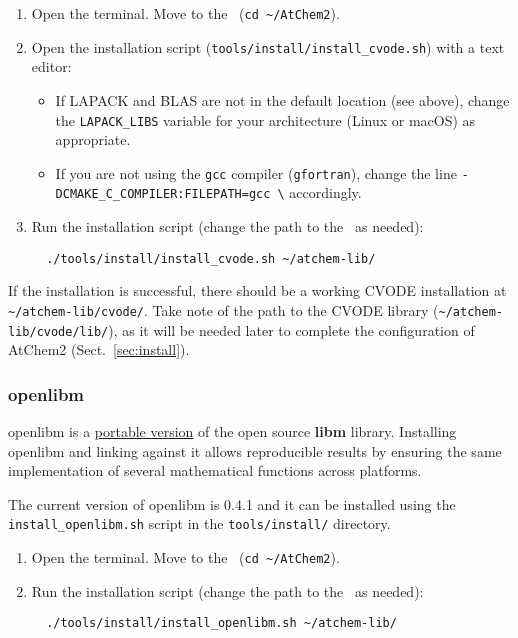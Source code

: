 \begin{enumerate}
\item Open the terminal. Move to the \maindir\ (\verb|cd ~/AtChem2|).
\item Open the installation script (\texttt{tools/install/install\_cvode.sh})
  with a text editor:
  \begin{itemize}
  \item If LAPACK and BLAS are not in the default location (see
    above), change the \texttt{LAPACK\_LIBS} variable for your
    architecture (Linux or macOS) as appropriate.
  \item If you are not using the \texttt{gcc} compiler
    (\texttt{gfortran}), change the line
    \texttt{-DCMAKE\_C\_COMPILER:FILEPATH=gcc \textbackslash}
    accordingly.
  \end{itemize}
\item Run the installation script (change the path to the \depdir\ as
  needed):
  \begin{verbatim}
  ./tools/install/install_cvode.sh ~/atchem-lib/
  \end{verbatim}
\end{enumerate}

If the installation is successful, there should be a working CVODE
installation at \texttt{\textasciitilde/atchem-lib/cvode/}. Take note
of the path to the CVODE library
(\texttt{\textasciitilde/atchem-lib/cvode/lib/}), as it will be needed
later to complete the configuration of AtChem2 (Sect.~\ref{sec:install}).

\subsubsection{openlibm}

openlibm is a \href{https://openlibm.org/}{portable version} of the
open source \textbf{libm} library. Installing openlibm and linking
against it allows reproducible results by ensuring the same
implementation of several mathematical functions across platforms.

The current version of openlibm is 0.4.1 and it can be installed using
the \texttt{install\_openlibm.sh} script in the \texttt{tools/install/}
directory.

\begin{enumerate}
\item Open the terminal. Move to the \maindir\ (\verb|cd ~/AtChem2|).
\item Run the installation script (change the path to the \depdir\ as
  needed):
  \begin{verbatim}
  ./tools/install/install_openlibm.sh ~/atchem-lib/
  \end{verbatim}
\end{enumerate}

